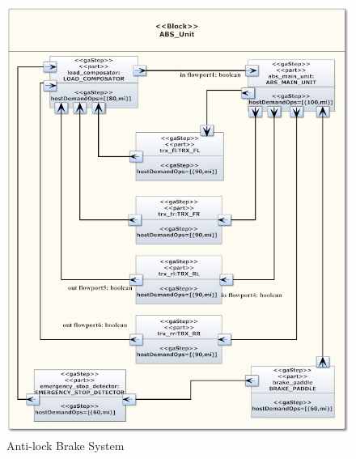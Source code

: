 \documentclass[3p,times,procedia,authoryear,round]{elsarticle}
\begin{document}
\begin{figure}[!htb]
    \centering
    
    \centering
    \includegraphics[width=350pt]{SwPlatformABS.jpg}
    \caption{Anti-lock Brake System  }
    \label{comp2}
    
\end{figure}
\end{document}

